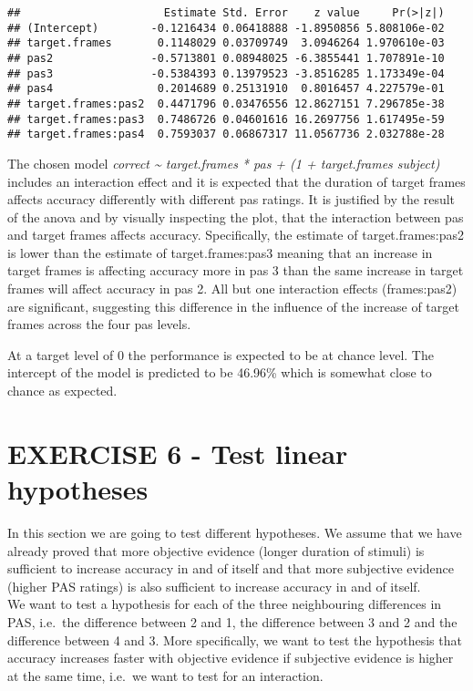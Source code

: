 \documentclass[
]{article}
\begin{document}
\begin{verbatim}
##                      Estimate Std. Error    z value     Pr(>|z|)
## (Intercept)        -0.1216434 0.06418888 -1.8950856 5.808106e-02
## target.frames       0.1148029 0.03709749  3.0946264 1.970610e-03
## pas2               -0.5713801 0.08948025 -6.3855441 1.707891e-10
## pas3               -0.5384393 0.13979523 -3.8516285 1.173349e-04
## pas4                0.2014689 0.25131910  0.8016457 4.227579e-01
## target.frames:pas2  0.4471796 0.03476556 12.8627151 7.296785e-38
## target.frames:pas3  0.7486726 0.04601616 16.2697756 1.617495e-59
## target.frames:pas4  0.7593037 0.06867317 11.0567736 2.032788e-28
\end{verbatim}

The chosen model \emph{correct \textasciitilde{} target.frames * pas +
(1 + target.frames \textbar{} subject)} includes an interaction effect
and it is expected that the duration of target frames affects accuracy
differently with different pas ratings. It is justified by the result of
the anova and by visually inspecting the plot, that the interaction
between pas and target frames affects accuracy. Specifically, the
estimate of target.frames:pas2 is lower than the estimate of
target.frames:pas3 meaning that an increase in target frames is
affecting accuracy more in pas 3 than the same increase in target frames
will affect accuracy in pas 2. All but one interaction effects
(frames:pas2) are significant, suggesting this difference in the
influence of the increase of target frames across the four pas levels.

At a target level of 0 the performance is expected to be at chance
level. The intercept of the model is predicted to be 46.96\% which is
somewhat close to chance as expected.

\hypertarget{exercise-6---test-linear-hypotheses}{%
\section{EXERCISE 6 - Test linear
hypotheses}\label{exercise-6---test-linear-hypotheses}}

In this section we are going to test different hypotheses. We assume
that we have already proved that more objective evidence (longer
duration of stimuli) is sufficient to increase accuracy in and of itself
and that more subjective evidence (higher PAS ratings) is also
sufficient to increase accuracy in and of itself.\\
We want to test a hypothesis for each of the three neighbouring
differences in PAS, i.e.~the difference between 2 and 1, the difference
between 3 and 2 and the difference between 4 and 3. More specifically,
we want to test the hypothesis that accuracy increases faster with
objective evidence if subjective evidence is higher at the same time,
i.e.~we want to test for an interaction.
\end{document}
